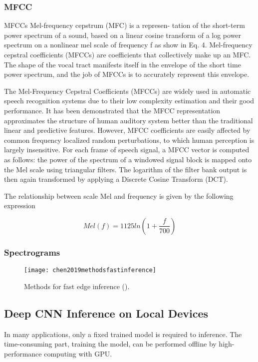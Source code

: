 \subsubsection*{MFCC}
MFCCs Mel-frequency cepstrum (MFC) is a represen- tation of the short-term power spectrum of a sound, based on a linear cosine transform of a log power spectrum on a nonlinear mel scale of frequency f as show in Eq. 4. Mel-frequency cepstral coefficients (MFCCs) are coefficients that collectively make up an MFC. The shape of the vocal tract manifests itself in the envelope of the short time power spectrum, and the job of MFCCs is to accurately represent this envelope.

The Mel-Frequency Cepstral Coefficients (MFCCs) are widely used in automatic speech recognition systems due to their low complexity estimation and their good performance. It has been demonstrated that the MFCC representation approximates the structure of human auditory system better than the traditional linear and predictive features. However, MFCC coefficients are easily affected by common frequency localized random perturbations, to which human perception is largely insensitive. For each frame of speech signal, a MFCC vector is computed as follows: the power of the spectrum of a windowed signal block is mapped onto the Mel scale using triangular filters. The logarithm of the filter bank output is then again transformed by applying a Discrete Cosine Transform (DCT). 

The relationship between scale Mel and frequency is given by the following expression


\[
\textit{Mel}(f) = 1125 \textit{ln} (1 + \frac{f}{700})
\]

\subsubsection{Spectrograms}

\begin{figure}[h]
\centering
\texttt{[image: chen2019methodsfastinference]}
\caption{Methods for fast edge inference (\cite{Chen2019}).}
\end{figure}

\subsection{Deep CNN Inference on Local Devices}

In many applications, only a fixed trained model is required
to inference. The time-consuming part, training the model, can be performed offline by high-performance computing with GPU.

